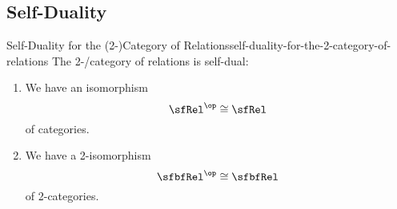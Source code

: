 \subsection{Self-Duality}\label{subsection-self-duality-of-rel}
\begin{proposition}{Self-Duality for the (2-)Category of Relations}{self-duality-for-the-2-category-of-relations}%
    The 2-/category of relations is self-dual:
    \begin{enumerate}
        \item\label{self-duality-for-the-2-category-of-relations-1}We have an isomorphism
            \[
                \sfRel^{\op}%
                \cong%
                \sfRel%
            \]%
            of categories.
        \item\label{self-duality-for-the-2-category-of-relations-2}We have a 2-isomorphism
            \[
                \sfbfRel^{\op}%
                \cong%
                \sfbfRel%
            \]%
            of 2-categories.
    \end{enumerate}
\end{proposition}
